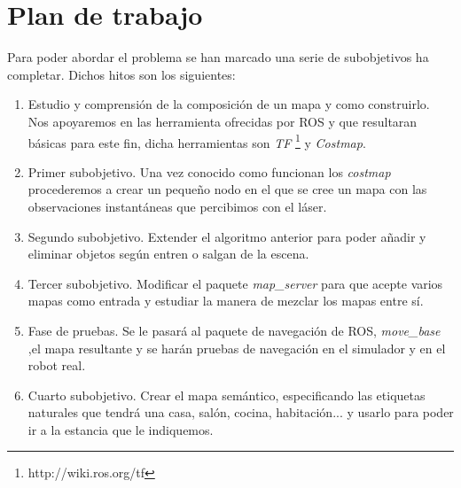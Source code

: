 \section{Plan de trabajo}
\label{sec:plandetrabajo}

Para poder abordar el problema se han marcado una serie de subobjetivos ha completar. Dichos hitos son los siguientes:

\begin{enumerate}
\item Estudio y comprensión de la composición de un mapa y como construirlo. Nos apoyaremos en las herramienta ofrecidas por ROS y que resultaran básicas para este fin, dicha herramientas son \textit{TF} \footnote{http://wiki.ros.org/tf} y \textit{Costmap}\footnotemark .
\item Primer subobjetivo. Una vez conocido como funcionan los \textit{costmap} procederemos a crear un pequeño nodo en el que se cree un mapa con las observaciones instantáneas que percibimos con el láser.
\item Segundo subobjetivo. Extender el algoritmo anterior para poder añadir y eliminar objetos según entren o salgan de la escena.
\item Tercer subobjetivo. Modificar el paquete \textit{map\_server} para que acepte varios mapas como entrada y estudiar la manera de mezclar los mapas entre sí.
\item Fase de pruebas. Se le pasará al paquete de navegación de ROS, \textit{move\_base} ,el mapa resultante y se harán pruebas de navegación en el simulador y en el robot real.
\item Cuarto subobjetivo. Crear el mapa semántico, especificando las etiquetas naturales que tendrá una casa, salón, cocina, habitación... y usarlo para poder ir a la estancia que le indiquemos.
\end{enumerate}

